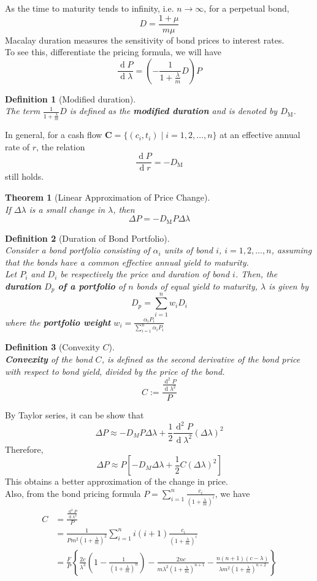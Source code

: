 \documentclass[12pt]{article}
\newtheorem{definition}{Definition}[section]
\newtheorem{theorem}{Theorem}[section]
\theoremstyle{definition}
\DeclareMathOperator{\diff}{d}
\newcommand\cf[1]{\mathbf{#1}}
\begin{document}
As the time to maturity tends to infinity, i.e. $n\to\infty$, for a perpetual bond,
\[
D=\frac{1+\mu}{m\mu}
\]
Macalay duration measures the sensitivity of bond prices to interest rates.\\
To see this, differentiate the pricing formula, we will have
\[
\frac{\diff P}{\diff \lambda}=\left(-\frac{1}{1+\frac{\lambda}{m}}D\right)P
\]
\begin{definition}[Modified duration]
\hfill\\\normalfont The term $\frac{1}{1+\frac{\lambda}{m}}D$ is defined as the \textbf{modified duration} and is denoted by $D_\text{M}$.
\end{definition}
In general, for a cash flow $\cf{C}=\{(c_i, t_i)\mid i = 1, 2,\ldots, n\}$ at an effective annual rate of $r$, the relation 
\[
\frac{\diff P}{\diff r} = -D_\text{M}
\]
still holds.
\begin{theorem}[Linear Approximation of Price Change]
\hfill\\\normalfont If $\Delta\lambda$ is a small change in $\lambda$, then
\[
\Delta P = -D_\text{M}P\Delta\lambda
\]
\end{theorem}
\begin{definition}[Duration of Bond Portfolio]
\hfill\\\normalfont Consider a bond portfolio consisting of $\alpha_i$ units of bond $i$, $i = 1, 2, \ldots, n$, assuming that the bonds have a \textit{common} effective annual yield to maturity.\\
Let $P_i$ and $D_i$ be respectively the price and duration of bond $i$. Then, the \textbf{duration} $D_p$ \textbf{of a portfolio} of $n$ bonds of equal yield to maturity, $\lambda$ is given by
\[
D_p = \sum_{i=1}^nw_iD_i
\]
where the \textbf{portfolio weight} $w_i = \frac{\alpha_i P_i}{\sum_{i=1}^n\alpha_i P_i}$
\end{definition}
\begin{definition}[Convexity $C$]
\hfill\\\normalfont \textbf{Convexity} of the bond $C$, is defined as the second derivative of the bond price with respect to bond yield, divided by the price of the bond.
\[
C:=\frac{\frac{\diff^2 P}{\diff \lambda^2}}{P}
\]
\end{definition}
By Taylor series, it can be show that
\[
\Delta P \approx -D_MP\Delta\lambda+\frac{1}{2}\frac{\diff^2 P}{\diff \lambda^2}(\Delta \lambda)^2
\]
Therefore,
\[
\Delta P \approx P\left[-D_M\Delta\lambda + \frac{1}{2}C(\Delta\lambda)^2\right]
\]
This obtains a better approximation of the change in price.\\
Also, from the bond pricing formula $P=\sum_{i=1}^n\frac{c_i}{\left(1+\frac{\lambda}{m}\right)^i}$, we have
\begin{align*}
C&=\frac{\frac{\diff^2 P}{\diff \lambda^2}}{P} \\
&=\frac{1}{Pm^2\left(1+\frac{\lambda}{m}\right)^2}\sum_{i=1}^n i(i+1)\frac{c_i}{\left(1+\frac{\lambda}{m}\right)^i}\\
&=\frac{F}{P}\left\{\frac{2c}{\lambda^3}\left(1-\frac{1}{\left(1+\frac{\lambda}{m}\right)^n}\right)-\frac{2nc}{m\lambda^2\left(1+\frac{\lambda}{m}\right)^{n+1}}-\frac{n(n+1)(c-\lambda)}{\lambda m^2\left(1+\frac{\lambda}{m}\right)^{n+2}}\right\}
\end{align*}
\end{document}
